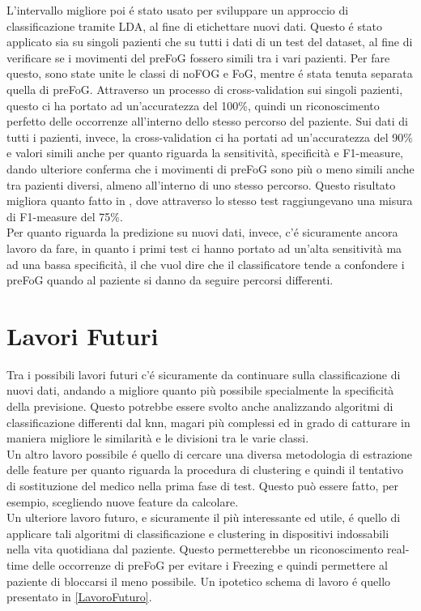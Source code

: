 L'intervallo migliore poi é stato usato per sviluppare un approccio di classificazione tramite LDA, al fine di etichettare nuovi dati. Questo é stato applicato sia su singoli pazienti che su tutti i dati di un test del dataset, al fine di verificare se i movimenti del preFoG fossero simili tra i vari pazienti. Per fare questo, sono state unite le classi di noFOG e FoG, mentre é stata tenuta separata quella di preFoG. Attraverso un processo di cross-validation sui singoli pazienti, questo ci ha portato ad un'accuratezza del 100\%, quindi un riconoscimento perfetto delle occorrenze all'interno dello stesso percorso del paziente. Sui dati di tutti i pazienti, invece, la cross-validation ci ha portati ad un'accuratezza del 90\% e valori simili anche per quanto riguarda la sensitività, specificità e F1-measure, dando ulteriore conferma che i movimenti di preFoG sono più o meno simili anche tra pazienti diversi, almeno all'interno di uno stesso percorso. Questo risultato migliora quanto fatto in \cite{12}, dove attraverso lo stesso test raggiungevano una misura di F1-measure del 75\%.\\
Per quanto riguarda la predizione su nuovi dati, invece, c'é sicuramente ancora lavoro da fare, in quanto i primi test ci hanno portato ad un'alta sensitività ma ad una bassa specificità, il che vuol dire che il classificatore tende a confondere i preFoG quando al paziente si danno da seguire percorsi differenti.
\section{Lavori Futuri}
Tra i possibili lavori futuri c'é sicuramente da continuare sulla classificazione di nuovi dati, andando a migliore quanto più possibile specialmente la specificità della previsione. Questo potrebbe essere svolto anche analizzando algoritmi di classificazione differenti dal knn, magari più complessi ed in grado di catturare in maniera migliore le similarità e le divisioni tra le varie classi.\\
Un altro lavoro possibile é quello di cercare una diversa metodologia di estrazione delle feature per quanto riguarda la procedura di clustering e quindi il tentativo di sostituzione del medico nella prima fase di test. Questo può essere fatto, per esempio, scegliendo nuove feature da calcolare.\\
Un ulteriore lavoro futuro, e sicuramente il più interessante ed utile, é quello di applicare tali algoritmi di classificazione e clustering in dispositivi indossabili nella vita quotidiana dal paziente. Questo permetterebbe un riconoscimento real-time delle occorrenze di preFoG per evitare i Freezing e quindi permettere al paziente di bloccarsi il meno possibile. Un ipotetico schema di lavoro é quello presentato in \ref{LavoroFuturo}.

